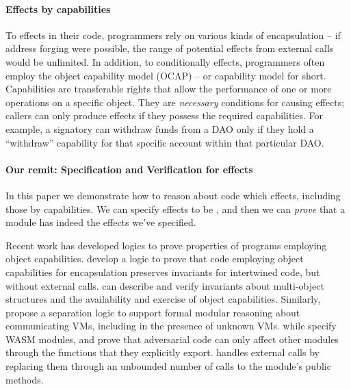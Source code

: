 \paragraph{Effects \tamed by capabilities} 
To \tame  effects  in their code, 
programmers rely on various kinds of  encapsulation -- \eg if address forging were possible, the range of potential effects from external calls would be unlimited.
In addition, to conditionally \tame effects, programmers often 
employ  the object capability model (OCAP)\cite{MillerPhD} --
 or capability model for short. 
Capabilities are transferable rights that allow the performance of one or more operations on a specific object. 
They are {\emph{necessary}} conditions for causing effects; callers can only produce effects if they possess the required capabilities. 
For example, a signatory can withdraw funds from a DAO only if they hold a ``withdraw'' capability for that specific account within that particular DAO.  



\paragraph{Our remit:  Specification and Verification for  \tamed effects}
In this paper we demonstrate how to reason about  code which \tames effects,
{including those \tamed by capabilities.}  
We can specify effects to be \tamed, 
and then we can \emph{prove} that a module has indeed \tamed the effects we've specified.

Recent work has developed logics to prove properties of programs employing object capabilities.
\citet{ddd} develop a logic to prove that code employing object
capabilities for encapsulation preserves invariants for
intertwined code, but without external calls. 
  \citet{dd}  can describe and verify invariants
about multi-object structures and the availability and exercise of object capabilities.  %
 Similarly,
{\citet{vmsl-pldi2023} propose a separation logic to support formal modular reasoning about communicating VMs, including in the presence of unknown VMs.
while \cite{irisWasm23} specify WASM modules, %
and prove that adversarial code  can only affect other modules through the functions} that they explicitly export. 
\citet{CassezFQ24}  handles external calls by replacing them through an unbounded number of calls to the module's public methods.
 
